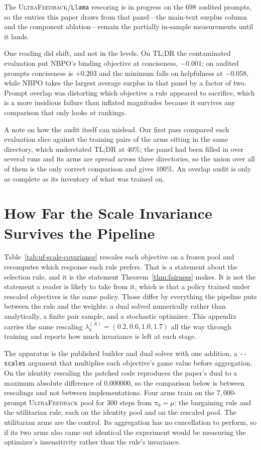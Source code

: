 \documentclass{article}
\theoremstyle{remark}
\theoremstyle{plain}
\newcommand{\NBPO}{\textsc{NBPO}}
\begin{document}
The \textsc{UltraFeedback}/\texttt{Llama} rescoring is in progress on the $698$ audited prompts, so the
entries this paper draws from that panel---the main-text surplus column and the component
ablation---remain the partially in-sample measurements until it lands.

One reading did shift, and not in the levels. On \textsc{TL;DR} the contaminated evaluation put \NBPO{}'s
binding objective at conciseness, $-0.001$; on audited prompts conciseness is $+0.203$ and the minimum falls
on helpfulness at $-0.058$, while \NBPO{} takes the largest average surplus in that panel by a factor of
two. Prompt overlap was distorting which objective a rule appeared to sacrifice, which is a more insidious
failure than inflated magnitudes because it survives any comparison that only looks at rankings.

A note on how the audit itself can mislead. Our first pass compared each evaluation slice against the
training pairs of the arms sitting in the same directory, which understated \textsc{TL;DR} at $40\%$; the
panel had been filled in over several runs and its arms are spread across three directories, so the union
over all of them is the only correct comparison and gives $100\%$. An overlap audit is only as complete as
its inventory of what was trained on.

\section{How Far the Scale Invariance Survives the Pipeline}
\label{app:scale-pipeline}
Table~\ref{tab:uf-scale-covariance} rescales each objective on a frozen pool and recomputes which response
each rule prefers. That is a statement about the selection rule, and it is the statement
Theorem~\ref{thm:fairness} makes. It is not the statement a reader is likely to take from it, which is that
a policy trained under rescaled objectives is the same policy. Those differ by everything the pipeline puts
between the rule and the weights: a dual solved numerically rather than analytically, a finite pair sample,
and a stochastic optimizer. This appendix carries the same rescaling $\lambda^{(A)}_k=(0.2,0.6,1.0,1.7)$
all the way through training and reports how much invariance is left at each stage.

The apparatus is the published builder and dual solver with one addition, a \texttt{-{}-scales} argument
that multiplies each objective's game value before aggregation. On the identity rescaling the patched code
reproduces the paper's dual to a maximum absolute difference of $0.000000$, so the comparison below is
between rescalings and not between implementations. Four arms train on the $7{,}000$-prompt
\textsc{UltraFeedback} pool for $300$ steps from $\pi_0=\mu$: the bargaining rule and the utilitarian rule,
each on the identity pool and on the rescaled pool. The utilitarian arms are the control. Its aggregation
has no cancellation to perform, so if its two arms also came out identical the experiment would be
measuring the optimizer's insensitivity rather than the rule's invariance.
\end{document}
